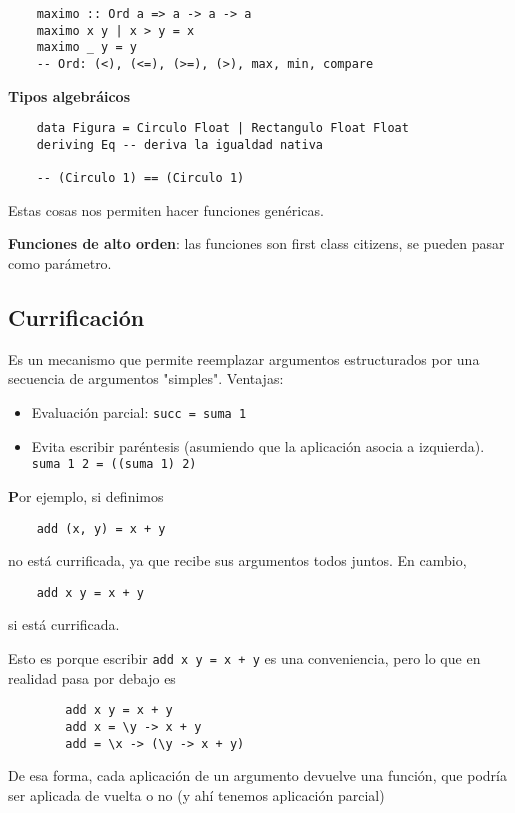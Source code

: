 \documentclass{report}
\theoremstyle{definition} %
\newenvironment{nota}[1]
    {\begin{leftbar}\textbf{#1}}
    {\end{leftbar}}
\begin{document}
\begin{verbatim}
    maximo :: Ord a => a -> a -> a
    maximo x y | x > y = x
    maximo _ y = y
    -- Ord: (<), (<=), (>=), (>), max, min, compare
\end{verbatim}

\textbf{Tipos algebráicos}

\begin{verbatim}
    data Figura = Circulo Float | Rectangulo Float Float
    deriving Eq -- deriva la igualdad nativa

    -- (Circulo 1) == (Circulo 1)
\end{verbatim}

Estas cosas nos permiten hacer funciones genéricas.

\textbf{Funciones de alto orden}: las funciones son first class citizens, se
pueden pasar como parámetro.

\subsection{Currificación}

Es un mecanismo que permite reemplazar argumentos estructurados por una
secuencia de argumentos "simples". Ventajas:

\begin{itemize}
    \item Evaluación parcial: \texttt{succ = suma 1}
    \item Evita escribir paréntesis (asumiendo que la aplicación asocia a
    izquierda). \texttt{suma 1 2 = ((suma 1) 2)}
\end{itemize}

\begin{nota}
    Por ejemplo, si definimos
    \begin{verbatim}
    add (x, y) = x + y
    \end{verbatim}
    no está currificada, ya que recibe sus argumentos todos juntos. En cambio,
    \begin{verbatim}
    add x y = x + y
    \end{verbatim}
    si está currificada.

    Esto es porque escribir \texttt{add x y = x + y} es una conveniencia, pero 
    lo que en realidad pasa por debajo es
    
    \begin{verbatim}
        add x y = x + y
        add x = \y -> x + y
        add = \x -> (\y -> x + y)
    \end{verbatim}

    De esa forma, cada aplicación de un argumento devuelve una función, que
    podría ser aplicada de vuelta o no (y ahí tenemos aplicación parcial)
\end{nota}
\end{document}
